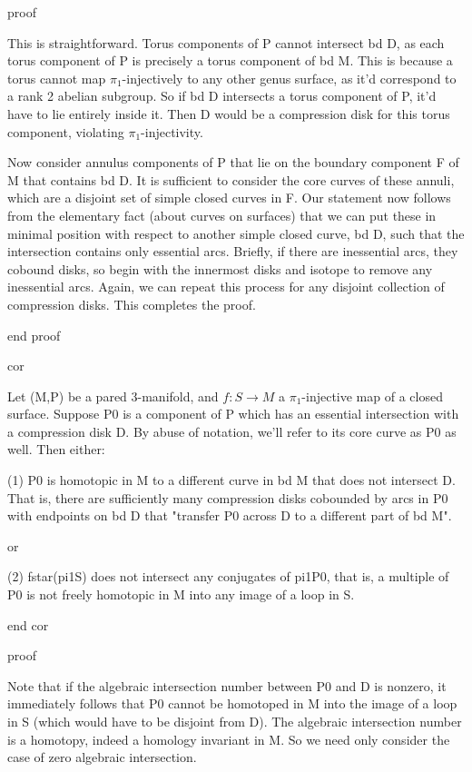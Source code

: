 proof

This is straightforward. Torus components of P cannot intersect bd D, as each
torus component of P is precisely a torus component of bd M. This is because
a torus cannot map $\pi_1$-injectively to any other genus surface, as it'd
correspond to a rank 2 abelian subgroup. So if bd D intersects a torus
component of P, it'd have to lie entirely inside it. Then D would be
a compression disk for this torus component, violating $\pi_1$-injectivity.

Now consider annulus components of P that lie on the boundary component F of
M that contains bd D. It is sufficient to consider the core curves of these
annuli, which are a disjoint set of simple closed curves in F. Our statement
now follows from the elementary fact (about curves on surfaces) that we can put
these in minimal position with respect to another simple closed curve, bd D,
such that the intersection contains only essential arcs. Briefly, if there are
inessential arcs, they cobound disks, so begin with the innermost disks and
isotope to remove any inessential arcs. Again, we can repeat this process for
any disjoint collection of compression disks. This completes the proof.

end proof

cor

Let (M,P) be a pared 3-manifold, and $f \colon S \to M$ a $\pi_1$-injective map
of a closed surface. Suppose P0 is a component of P which has an essential
intersection with a compression disk D. By abuse of notation, we'll refer to
its core curve as P0 as well. Then either:

(1) P0 is homotopic in M to a different curve in bd M that does not intersect
D. That is, there are sufficiently many compression disks cobounded by arcs in
P0 with endpoints on bd D that "transfer P0 across D to a different part of bd
M".

or

(2) fstar(pi1S) does not intersect any conjugates of pi1P0, that is, a multiple
of P0 is not freely homotopic in M into any image of a loop in S.

end cor

proof

Note that if the algebraic intersection number between P0 and D is nonzero, it
immediately follows that P0 cannot be homotoped in M into the image of a loop
in S (which would have to be disjoint from D). The algebraic intersection
number is a homotopy, indeed a homology invariant in M. So we need only
consider the case of zero algebraic intersection.

